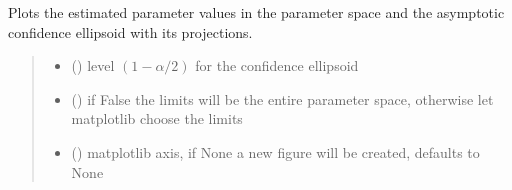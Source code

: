 \documentclass[letterpaper,10pt,english]{sphinxmanual}
\begin{document}
\begin{fulllineitems}
\begin{fulllineitems}
\end{fulllineitems}


\begin{fulllineitems}
\label{\detokenize{cubmods:cubmods.cube.CUBresCUBE.plot3d}}
\pysigstartsignatures
{}
\pysigstopsignatures
\sphinxAtStartPar
Plots the estimated parameter values in the parameter space and
the asymptotic confidence ellipsoid with its projections.
\begin{quote}\begin{description}
\begin{itemize}
\item {} 
\sphinxAtStartPar
{} () \textendash{} level \((1-\alpha/2)\) for the confidence ellipsoid

\item {} 
\sphinxAtStartPar
{} () \textendash{} if False the limits will be the entire parameter space, otherwise let matplotlib choose the limits

\item {} 
\sphinxAtStartPar
{} (\sphinxstyleliteralemphasis{\sphinxupquote{, }}) \textendash{} matplotlib axis, if None a new figure will be created, defaults to None

\end{itemize}

\end{description}\end{quote}

\end{fulllineitems}



\end{fulllineitems}
\end{document}
